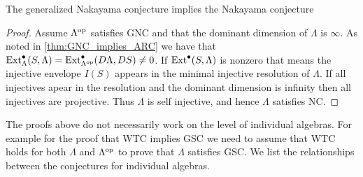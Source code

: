 %		
%		
%		
%

\begin{prop}\cite{AR75} 
	The generalized Nakayama conjecture implies the Nakayama conjecture
	\begin{proof}
		Assume $\Lambda^{\operatorname{op}}$ satisfies GNC and that the dominant dimension of $\Lambda$ is $\infty$. As noted in \cref{thm:GNC_implies_ARC} we have that $\operatorname{Ext}_\Lambda^\bullet(S, \Lambda) = \operatorname{Ext}_{\Lambda^{\operatorname{op}}}^\bullet(D\Lambda, DS) \neq 0 $. If $\operatorname{Ext}^\bullet(S, \Lambda)$ is nonzero that means the injective envelope $I(S)$ appears in the minimal injective resolution of $\Lambda$. If all injectives apear in the resolution and the dominant dimension is infinity then all injectives are projective. Thus $\Lambda$ is self injective, and hence $\Lambda$ satisfies NC. 
	\end{proof}
\end{prop}

The proofs above do not necessarily work on the level of individual algebras. For example for the proof that WTC implies GSC we need to assume that WTC holds for both $\Lambda$ and $\Lambda^{\operatorname{op}}$ to prove that $\Lambda$ satisfies GSC. We list the relationships between the conjectures for individual algebras.

